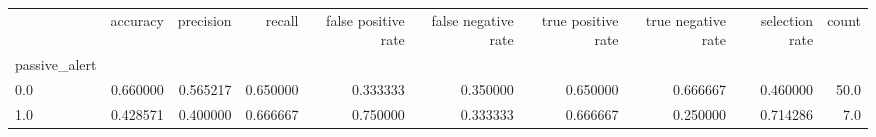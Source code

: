 \begin{tabular}{lrrrrrrrrr}
\toprule
{} &  accuracy &  precision &    recall &  false positive rate &  false negative rate &  true positive rate &  true negative rate &  selection rate &  count \\
passive\_alert &           &            &           &                      &                      &                     &                     &                 &        \\
\midrule
0.0           &  0.660000 &   0.565217 &  0.650000 &             0.333333 &             0.350000 &            0.650000 &            0.666667 &        0.460000 &   50.0 \\
1.0           &  0.428571 &   0.400000 &  0.666667 &             0.750000 &             0.333333 &            0.666667 &            0.250000 &        0.714286 &    7.0 \\
\bottomrule
\end{tabular}
